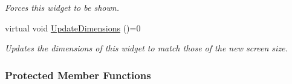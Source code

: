 \begin{DoxyCompactItemize}
\begin{DoxyCompactList}\small\item\em Forces this widget to be shown. \item\end{DoxyCompactList}\item 
virtual void \hyperlink{classMezzanine_1_1UI_1_1Widget_af23f919f2912ac10230953a848c9889c}{UpdateDimensions} ()=0
\begin{DoxyCompactList}\small\item\em Updates the dimensions of this widget to match those of the new screen size. \item\end{DoxyCompactList}\end{DoxyCompactItemize}
\subsubsection*{Protected Member Functions}
